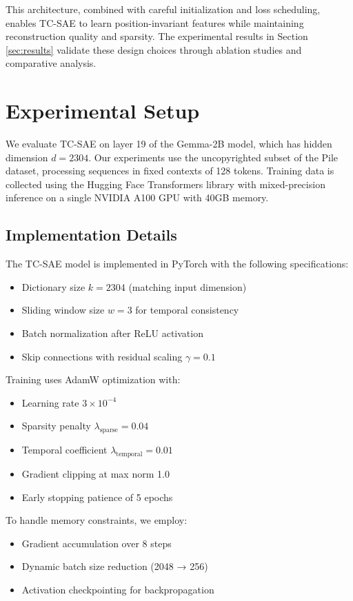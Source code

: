 \documentclass{article} %
\begin{document}
This architecture, combined with careful initialization and loss scheduling, enables TC-SAE to learn position-invariant features while maintaining reconstruction quality and sparsity. The experimental results in Section \ref{sec:results} validate these design choices through ablation studies and comparative analysis.

\section{Experimental Setup}
\label{sec:experimental}

We evaluate TC-SAE on layer 19 of the Gemma-2B model, which has hidden dimension $d=2304$. Our experiments use the uncopyrighted subset of the Pile dataset, processing sequences in fixed contexts of 128 tokens. Training data is collected using the Hugging Face Transformers library with mixed-precision inference on a single NVIDIA A100 GPU with 40GB memory.

\subsection{Implementation Details}
The TC-SAE model is implemented in PyTorch with the following specifications:
\begin{itemize}
    \item Dictionary size $k=2304$ (matching input dimension)
    \item Sliding window size $w=3$ for temporal consistency
    \item Batch normalization after ReLU activation
    \item Skip connections with residual scaling $\gamma=0.1$
\end{itemize}

Training uses AdamW optimization with:
\begin{itemize}
    \item Learning rate $3 \times 10^{-4}$
    \item Sparsity penalty $\lambda_{\text{sparse}}=0.04$
    \item Temporal coefficient $\lambda_{\text{temporal}}=0.01$
    \item Gradient clipping at max norm 1.0
    \item Early stopping patience of 5 epochs
\end{itemize}

To handle memory constraints, we employ:
\begin{itemize}
    \item Gradient accumulation over 8 steps
    \item Dynamic batch size reduction (2048 → 256)
    \item Activation checkpointing for backpropagation
\end{itemize}
\end{document}
